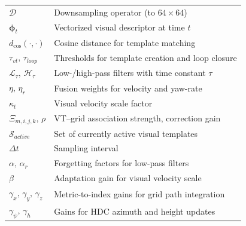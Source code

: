 {\begin{longtable}{p{}p{}}
            $\mathcal{D}$                                               & Downsampling operator (to $64\times64$)                              \\
            $\boldsymbol{\phi}_t$                                       & Vectorized visual descriptor at time $t$                             \\
            $d_{\cos}(\cdot,\cdot)$                                     & Cosine distance for template matching                                \\
            $\tau_{vt},\,\tau_{loop}$                                   & Thresholds for template creation and loop closure                    \\
            $\mathcal{L}_\tau,\,\mathcal{H}_\tau$                       & Low-/high-pass filters with time constant $\tau$                     \\
            $\eta,\,\eta_r$                                             & Fusion weights for velocity and yaw-rate                             \\
            $\kappa_t$                                                  & Visual velocity scale factor                                         \\
            $\Xi_{m,i,j,k},\,\rho$                                      & VT--grid association strength, correction gain                       \\
            $\mathcal{S}_{active}$                                      & Set of currently active visual templates                             \\
            $\Delta t$                                                  & Sampling interval                                                    \\
            $\alpha,\,\alpha_r$                                         & Forgetting factors for low-pass filters                              \\
            $\beta$                                                     & Adaptation gain for visual velocity scale                            \\
            $\gamma_x,\,\gamma_y,\,\gamma_z$                            & Metric-to-index gains for grid path integration                      \\
            $\gamma_\psi,\,\gamma_h$                                    & Gains for HDC azimuth and height updates                             \\

\end{longtable}}
